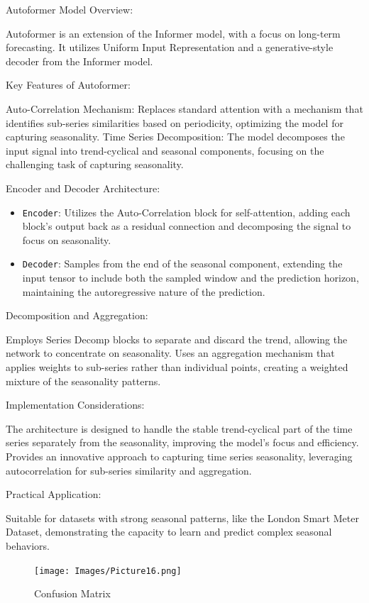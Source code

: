 \documentclass{article}
\begin{document}
Autoformer Model Overview:

Autoformer is an extension of the Informer model, with a focus on long-term forecasting.
It utilizes Uniform Input Representation and a generative-style decoder from the Informer model.

Key Features of Autoformer:

Auto-Correlation Mechanism: Replaces standard attention with a mechanism that identifies sub-series similarities based on periodicity, optimizing the model for capturing seasonality.
Time Series Decomposition: The model decomposes the input signal into trend-cyclical and seasonal components, focusing on the challenging task of capturing seasonality.

Encoder and Decoder Architecture:

\begin{itemize}
  \item \texttt{Encoder}: Utilizes the Auto-Correlation block for self-attention, adding each block's output back as a residual connection and decomposing the signal to focus on seasonality.
  \item \texttt{Decoder}: Samples from the end of the seasonal component, extending the input tensor to include both the sampled window and the prediction horizon, maintaining the autoregressive nature of the prediction.
\end{itemize}

Decomposition and Aggregation:

Employs Series Decomp blocks to separate and discard the trend, allowing the network to concentrate on seasonality.
Uses an aggregation mechanism that applies weights to sub-series rather than individual points, creating a weighted mixture of the seasonality patterns.

Implementation Considerations:

The architecture is designed to handle the stable trend-cyclical part of the time series separately from the seasonality, improving the model's focus and efficiency.
Provides an innovative approach to capturing time series seasonality, leveraging autocorrelation for sub-series similarity and aggregation.

Practical Application:

Suitable for datasets with strong seasonal patterns, like the London Smart Meter Dataset, demonstrating the capacity to learn and predict complex seasonal behaviors.

\begin{figure}
    \centering
    \texttt{[image: Images/Picture16.png]}
    \caption{Confusion Matrix}
    \label{fig:enter-labe}
\end{figure}
\end{document}
